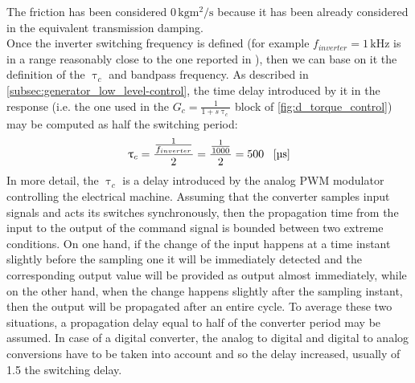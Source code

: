 The friction has been considered $ 0 \, \si{\kilo\gram\square\meter\per\second}$ because it has been already considered in the equivalent transmission damping. \\
 Once the inverter switching frequency is defined (for example $f_{inverter}=1\, \si{\kilo\hertz}$ is in a range reasonably close to the one reported in \cite{ABB_manual}), then we can base on it the definition of the $\uptau_c$ and bandpass frequency. As described in \autoref{subsec:generator_low_level-control}, the time delay introduced by it in the response (i.e. the one used in the $G_c=\frac{1}{1+s\uptau_c}$ block of \autoref{fig:d_torque_control}) may be computed as half the switching period:
 \begin{gather}
 \uptau_{c}=\frac{\frac{1}{f_{inverter}}}{2}=\frac{\frac{1}{1000}}{2}=500 \ \ \left[\si{\micro \second}\right]
 \end{gather}
 In more detail, the $\uptau_c$ is a delay introduced by the analog PWM modulator controlling the electrical machine. Assuming that the converter samples input signals and acts its switches synchronously, then the propagation time from the input to the output of the command signal is bounded between two extreme conditions. On one hand, if the change of the input happens at a time instant slightly before the sampling one it will be immediately detected and the corresponding output value will be provided as output almost immediately, while on the other hand, when the change happens slightly after the sampling instant, then the output will be propagated after an entire cycle. To average these two situations, a propagation delay equal to half of the converter period may be assumed. In case of a digital converter, the analog to digital and digital to analog conversions have to be taken into account and so the delay increased, usually of 1.5 the switching delay.
 
